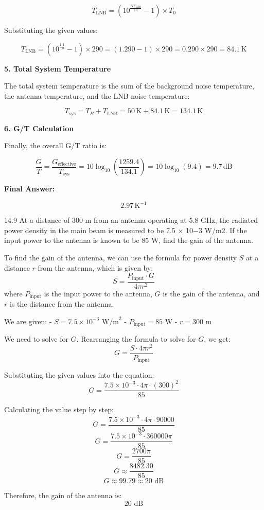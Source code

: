 \documentclass[cn,12pt]{homework}
\begin{document}
\begin{solution}
\[
T_{\text{LNB}} = \left(10^{\frac{NF_{\text{LNB}}}{10}} - 1\right) \times T_0
\]

Substituting the given values:

\[
T_{\text{LNB}} = \left(10^{\frac{1.1}{10}} - 1\right) \times 290 = (1.290 - 1) \times 290 = 0.290 \times 290 = 84.1 \, \text{K}
\]

\textbf{5. Total System Temperature}

The total system temperature is the sum of the background noise temperature, the antenna temperature, and the LNB noise temperature:

\[
T_{\text{sys}} = T_B + T_{\text{LNB}} = 50 \, \text{K}  + 84.1 \, \text{K} = 134.1 \, \text{K}
\]

\textbf{6. G/T Calculation}

Finally, the overall G/T ratio is:

\[
\frac{G}{T} = \frac{G_{\text{effective}}}{T_{\text{sys}}} = 10 \log_{10}\left(\frac{1259.4}{134.1}\right) = 10 \log_{10}(9.4) = 9.7 \, \text{dB}
\]

\textbf{Final Answer:}

\[
\boxed{2.97 \, \text{K}^{-1}}
\]
\end{solution}
\newpage

14.9 At a distance of 300 m from an antenna operating at 5.8 GHz, the radiated power density in the main
beam is measured to be 7.5 × 10−3 W/m2. If the input power to the antenna is known to be 85 W,
find the gain of the antenna.




\begin{solution}
  To find the gain of the antenna, we can use the formula for power density \( S \) at a distance \( r \) from the antenna, which is given by:
\[
S = \frac{P_{\text{input}} \cdot G}{4\pi r^2}
\]
where \( P_{\text{input}} \) is the input power to the antenna, \( G \) is the gain of the antenna, and \( r \) is the distance from the antenna.

We are given:
- \( S = 7.5 \times 10^{-3} \text{ W/m}^2 \)
- \( P_{\text{input}} = 85 \text{ W} \)
- \( r = 300 \text{ m} \)

We need to solve for \( G \). Rearranging the formula to solve for \( G \), we get:
\[
G = \frac{S \cdot 4\pi r^2}{P_{\text{input}}}
\]

Substituting the given values into the equation:
\[
G = \frac{7.5 \times 10^{-3} \cdot 4\pi \cdot (300)^2}{85}
\]

Calculating the value step by step:
\[
G = \frac{7.5 \times 10^{-3} \cdot 4\pi \cdot 90000}{85}
\]
\[
G = \frac{7.5 \times 10^{-3} \cdot 360000\pi}{85}
\]
\[
G = \frac{2700\pi}{85}
\]
\[
G \approx \frac{8482.30}{85}
\]
\[
G \approx 99.79 \approx 20  \text{ dB}
\]


Therefore, the gain of the antenna is:
\[
\boxed{20 \text{ dB}}
\]
\end{solution}
\newpage
\end{document}
